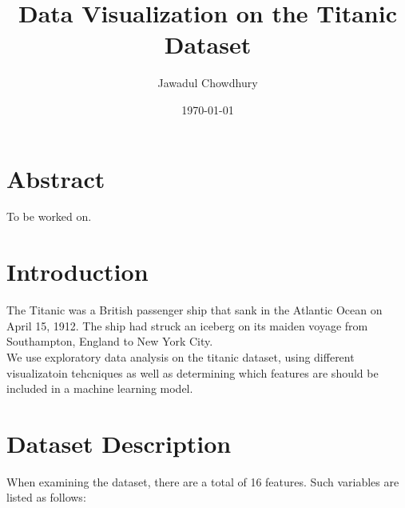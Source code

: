 \documentclass[a4paper, twocolumn]{article}
\begin{document}
\title{Data Visualization on the Titanic Dataset}
\author{Jawadul Chowdhury}
\date{\today}
\maketitle

\section{Abstract}
To be worked on.

\section{Introduction}
The Titanic was a British passenger ship that sank in the Atlantic
Ocean on April 15, 1912. The ship had struck an iceberg on its
maiden voyage from Southampton, England to New York City. \\

We use exploratory data analysis on the titanic dataset, using 
different visualizatoin tehcniques as well as determining which
features are should be included in a machine learning model.

\section{Dataset Description}
When examining the dataset, there are a total of 16 features. Such 
variables are listed as follows:
\end{document}
